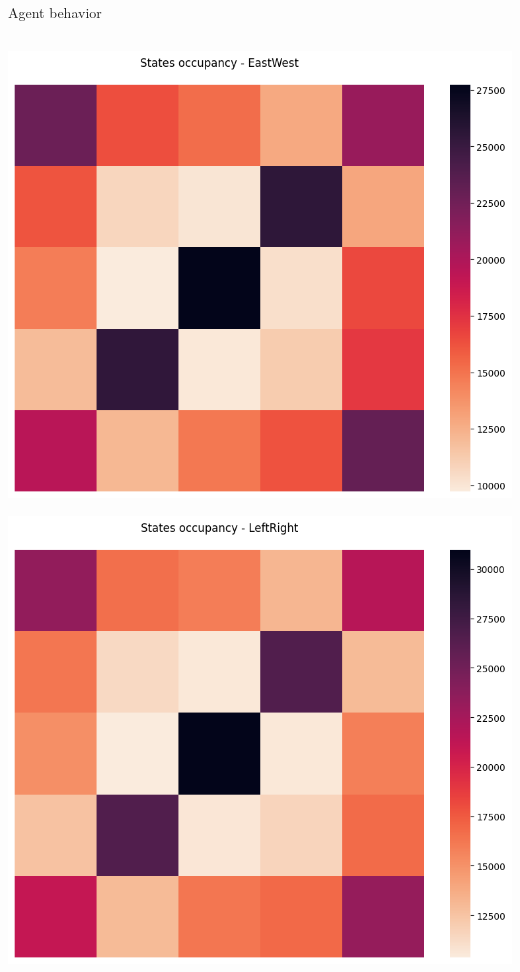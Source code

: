 \documentclass[bigger]{beamer}
\begin{document}
\begin{frame}[label={sec:org3d777c1}]{Agent behavior}
\begin{columns}
\begin{column}[c]{0.25\columnwidth}
\begin{center}
\includegraphics[width=\linewidth]{img/states-occupancy-EastWest.png}
\end{center}
\begin{center}
\includegraphics[width=\linewidth]{img/states-occupancy-LefRight.png}
\end{center}
\end{column}
\end{columns}
\end{frame}
\end{document}
